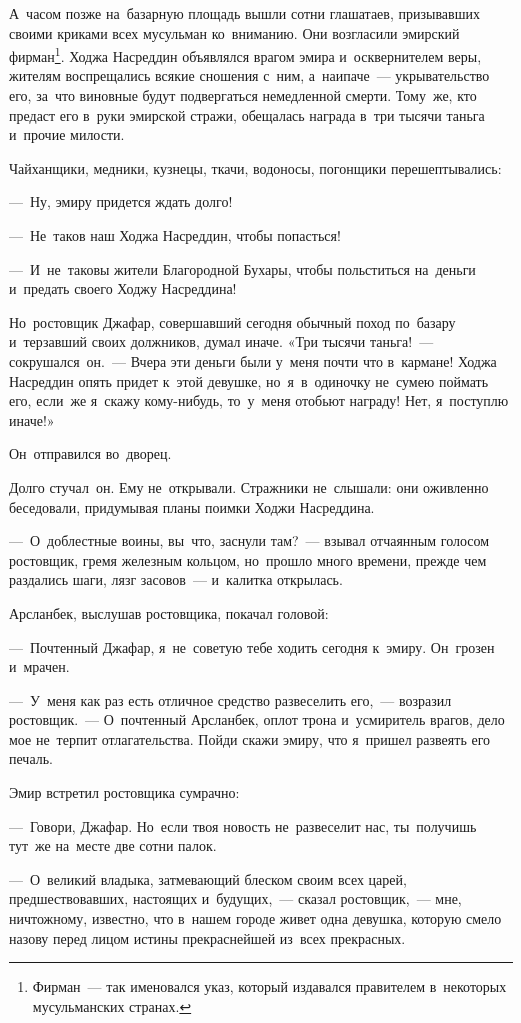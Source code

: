 \documentclass[12pt,a4paper]{book}
\begin{document}
А~часом позже на~базарную площадь вышли сотни глашатаев, призывавших своими криками всех мусульман ко~вниманию. Они возгласили эмирский фирман\footnote{Фирман~— так именовался указ, который издавался правителем в~некоторых мусульманских странах.}. Ходжа Насреддин объявлялся врагом эмира и~осквернителем веры, жителям воспрещались всякие сношения с~ним, а~наипаче~— укрывательство его, за~что виновные будут подвергаться немедленной смерти. Тому~же, кто предаст его в~руки эмирской стражи, обещалась награда в~три тысячи таньга и~прочие милости.

Чайханщики, медники, кузнецы, ткачи, водоносы, погонщики перешептывались:

—~Ну, эмиру придется ждать долго!

—~Не~таков наш Ходжа Насреддин, чтобы попасться!

—~И~не~таковы жители Благородной Бухары, чтобы польститься на~деньги и~предать своего Ходжу Насреддина!

Но~ростовщик Джафар, совершавший сегодня обычный поход по~базару и~терзавший своих должников, думал иначе. «Три тысячи таньга!~— сокрушался~он.~— Вчера эти деньги были у~меня почти что в~кармане! Ходжа Насреддин опять придет к~этой девушке, но~я~в~одиночку не~сумею поймать его, если~же я~скажу кому-нибудь, то~у~меня отобьют награду! Нет, я~поступлю иначе!»

Он~отправился во~дворец.

Долго стучал~он. Ему не~открывали. Стражники не~слышали: они оживленно беседовали, придумывая планы поимки Ходжи Насреддина.

—~О~доблестные воины, вы~что, заснули там?~— взывал отчаянным голосом ростовщик, гремя железным кольцом, но~прошло много времени, прежде чем раздались шаги, лязг засовов~— и~калитка открылась.

Арсланбек, выслушав ростовщика, покачал головой:

—~Почтенный Джафар, я~не~советую тебе ходить сегодня к~эмиру. Он~грозен и~мрачен.

—~У~меня как раз есть отличное средство развеселить его,~— возразил ростовщик.~— О~почтенный Арсланбек, оплот трона и~усмиритель врагов, дело мое не~терпит отлагательства. Пойди скажи эмиру, что я~пришел развеять его печаль.

Эмир встретил ростовщика сумрачно:

—~Говори, Джафар. Но~если твоя новость не~развеселит нас, ты~получишь тут~же на~месте две сотни палок.

—~О~великий владыка, затмевающий блеском своим всех царей, предшествовавших, настоящих и~будущих,~— сказал ростовщик,~— мне, ничтожному, известно, что в~нашем городе живет одна девушка, которую смело назову перед лицом истины прекраснейшей из~всех прекрасных.
\end{document}
